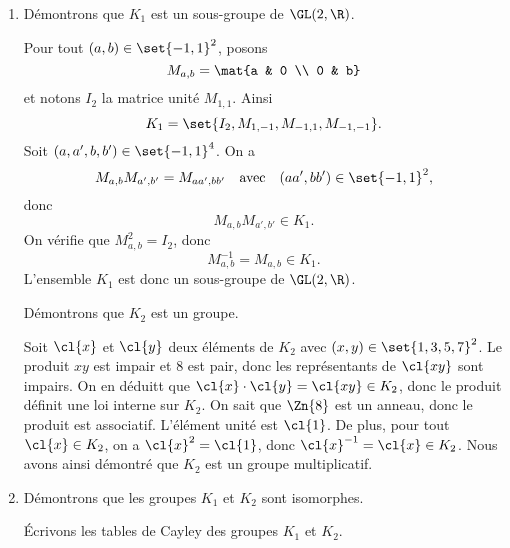 \begin{enumerate}
  \item
    Démontrons que $K_1$ est un sous-groupe de $\GL(2,\R)$.

    Pour tout $(a,b)\in\set{-1,1}^2$, posons
    \[
      M_{a,b} = \mat{a & 0 \\ 0 & b}
    \]
    et notons $I_2$ la matrice unité $M_{1,1}$. Ainsi
    \[
      K_1 = \set{I_2, M_{1,-1}, M_{-1,1}, M_{-1,-1}}.
    \]
    Soit $(a,a',b,b')\in\set{-1,1}^4$. On a
    \[
      M_{a,b} M_{a',b'} = M_{aa',bb'}\quad\text{avec}\quad (aa',bb')\in\set{-1,1}^2,
    \]
    donc
    \[
      M_{a,b}M_{a',b'} \in K_1.
    \]
    On vérifie que $M_{a,b}^2 = I_2$, donc
    \[
      M_{a,b}^{-1} = M_{a,b}\in K_1.
    \]
    L'ensemble $K_1$ est donc un sous-groupe de $\GL(2,\R)$.

    Démontrons que $K_2$ est un groupe.

    Soit $\cl{x}$ et $\cl{y}$ deux éléments de $K_2$ avec $(x,y)\in\set{1,3,5,7}^2$.
    Le produit $xy$ est impair et $8$ est pair, donc les représentants de
    $\cl{xy}$ sont impairs. On en déduitt que $\cl{x}\cdot\cl{y} =
    \cl{xy}\in K_2$, donc le produit définit une loi interne sur $K_2$. On sait
    que $\Zn{8}$ est un anneau, donc le produit est associatif. L'élément unité
    est $\cl{1}$.  De plus, pour tout $\cl{x}\in K_2$, on a $\cl{x}^2 = \cl{1}$,
    donc $\cl{x}^{-1} = \cl{x}\in K_2$. Nous avons ainsi démontré que $K_2$ est
    un groupe multiplicatif.

  \item
    Démontrons que les groupes $K_1$ et $K_2$ sont isomorphes.

    Écrivons les tables de Cayley des groupes $K_1$ et $K_2$.


\end{enumerate}
